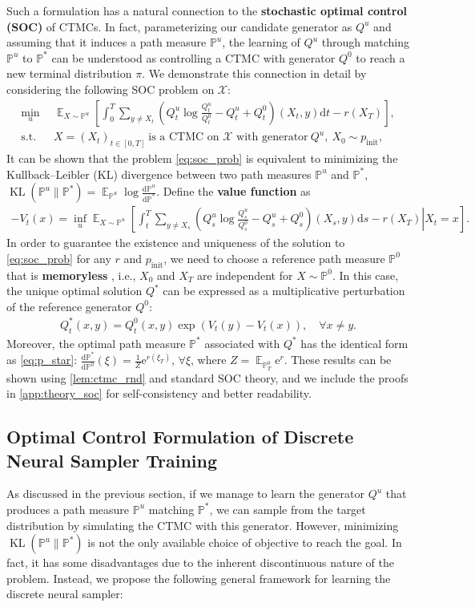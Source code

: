 \documentclass{article}
\theoremstyle{remark}
\newcommand{\ro}[1]{\left(#1\right)} %
\newcommand{\sq}[1]{\left[#1\right]} %
\newcommand{\e}{\mathrm{e}}
\renewcommand{\P}{\mathbb{P}}
\newcommand{\E}{\operatorname{\mathbb{E}}}
\renewcommand{\d}{\mathrm{d}}
\newcommand{\de}[2]{\frac{\mathrm{d}#1}{\mathrm{d}#2}} %
\newcommand{\kl}{\operatorname{KL}}
\newcommand{\cX}{\mathcal{X}}
\newcommand{\pinit}{p_\mathrm{init}}
\begin{document}
Such a formulation has a natural connection to the \textbf{stochastic optimal control (SOC)} of CTMCs. In fact, parameterizing our candidate generator as $Q^u$ and assuming that it induces a path measure $\P^u$,
%
the learning of $Q^u$ through matching $\P^u$ to $\P^*$ can be understood as controlling a CTMC with generator $Q^0$ to reach a new terminal distribution $\pi$. We demonstrate this connection in detail by considering the following SOC problem on $\cX$:
\begin{equation}
\begin{aligned}
    \min_{u}~~&\E_{X\sim\P^u}\sq{\int_0^T\sum_{y\ne X_t}\ro{Q^u_t\log\frac{Q^u_t}{Q^0_t}-Q^u_t+Q^0_t}(X_t,y)\d t-r(X_T)},\\
    \mathrm{s.t.}~~&X=(X_t)_{t\in[0,T]}~\text{is a CTMC on $\cX$ with generator}~Q^u,~X_0\sim \pinit,
\end{aligned}
\label{eq:soc_prob}
\end{equation}
It can be shown that the problem \cref{eq:soc_prob} is equivalent to minimizing the Kullback–Leibler (KL) divergence between two path measures $\P^u$ and $\P^*$, $ \kl(\P^u\|\P^*)=\E_{\P^u}\log\de{\P^u}{\P^*}$. 
%
%
%
Define the \textbf{value function} as
\begin{align}
\label{eq:value-func}
-V_t(x)=\inf_u\E_{X\sim\P^u}\sq{\left.\int_t^T\sum_{y\ne X_s}\ro{Q^u_s\log\frac{Q^u_s}{Q^0_s}-Q^u_s+Q^0_s}(X_s,y)\d s-r(X_T)\right|X_t=x}.
\end{align}
In order to guarantee the existence and uniqueness of the solution to \cref{eq:soc_prob} for any $r$ and $\pinit$, we need to choose a 
%
reference path measure $\P^0$ that is \textbf{memoryless} \cite{domingoenrich2025adjoint}, i.e., $X_0$ and $X_T$ are independent for $X\sim\P^0$. In this case, the unique optimal solution $Q^*$ can be expressed as a multiplicative perturbation of the reference generator $Q^0$:
\begin{align}
    Q^{*}_{t}(x,y) = Q^{0}_t(x,y) \exp(V_t(y) - V_t(x)), \quad \forall x \neq y.
    \label{eq:q_star_q_0}
\end{align}
Moreover, the optimal path measure $\P^*$ associated with $Q^*$ has the identical form as \cref{eq:p_star}: $\de{\P^*}{\P^0}(\xi)=\frac{1}{Z}\e^{r(\xi_T)}$, $\forall\xi$, where $Z=\E_{\P^0_T}\e^r$. These results can be shown using \cref{lem:ctmc_rnd} and standard SOC theory, and we include the proofs in \cref{app:theory_soc} for self-consistency and better readability.


\subsection{Optimal Control Formulation of Discrete Neural Sampler Training}
\label{sec:sampler_soc_training}
As discussed in the previous section, if we manage to learn the generator $Q^u$ that produces a path measure $\P^u$ matching $\P^*$, we can sample from the target distribution by simulating the CTMC with this generator. However, minimizing $\kl(\P^u \|\P^*)$ is not the only available choice of objective to reach the goal. In fact, it has some disadvantages due to the inherent discontinuous nature of the problem. Instead, we propose the following general framework for learning the discrete neural sampler:
\end{document}
